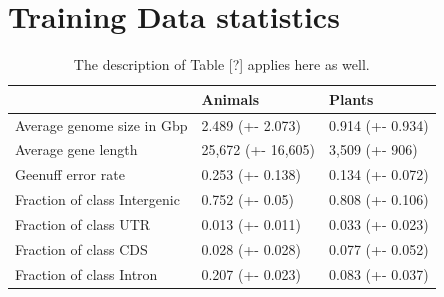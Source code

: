 \documentclass{article}
\begin{document}
%
%
%
\clearpage
\section{Training Data statistics}
\label{sec:training_data}
\begin{table}[!h]
\renewcommand\thetable{S1}
\centering
\begin{tabular}{@{}lll@{}}
\hline
& Animals & Plants\\ [0.5ex]
\hline
Average genome size in Gbp& 2.489 (+- 2.073) & 0.914 (+- 0.934) \\
Average gene length & 25,672 (+- 16,605) & 3,509 (+- 906)\\
Geenuff error rate & 0.253 (+- 0.138) & 0.134 (+- 0.072) \\
Fraction of class Intergenic & 0.752 (+- 0.05) & 0.808 (+- 0.106) \\
Fraction of class UTR & 0.013 (+- 0.011) & 0.033 (+- 0.023) \\
Fraction of class CDS & 0.028 (+- 0.028) & 0.077 (+- 0.052) \\
Fraction of class Intron  & 0.207 (+- 0.023) & 0.083 (+- 0.037) \\
\hline
\end{tabular}
\caption{The description of Table [?] applies here as well.}
\end{table}
\end{document}
